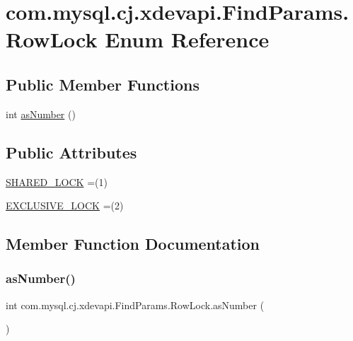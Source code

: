 \hypertarget{enumcom_1_1mysql_1_1cj_1_1xdevapi_1_1_find_params_1_1_row_lock}{}\section{com.\+mysql.\+cj.\+xdevapi.\+Find\+Params.\+Row\+Lock Enum Reference}
\label{enumcom_1_1mysql_1_1cj_1_1xdevapi_1_1_find_params_1_1_row_lock}
\subsection*{Public Member Functions}
\begin{DoxyCompactItemize}
\item 
int \mbox{\hyperlink{enumcom_1_1mysql_1_1cj_1_1xdevapi_1_1_find_params_1_1_row_lock_a57a87f452853827c81efc7860be4f7e6}{as\+Number}} ()
\end{DoxyCompactItemize}
\subsection*{Public Attributes}
\begin{DoxyCompactItemize}
\item 
\mbox{\hyperlink{enumcom_1_1mysql_1_1cj_1_1xdevapi_1_1_find_params_1_1_row_lock_a56bd068879b1d9dda39f4b1a082cb022}{S\+H\+A\+R\+E\+D\+\_\+\+L\+O\+CK}} =(1)
\item 
\mbox{\hyperlink{enumcom_1_1mysql_1_1cj_1_1xdevapi_1_1_find_params_1_1_row_lock_acef98c8e1183e4ff2af9bff73f5d400c}{E\+X\+C\+L\+U\+S\+I\+V\+E\+\_\+\+L\+O\+CK}} =(2)
\end{DoxyCompactItemize}


\subsection{Member Function Documentation}
\mbox{\label{enumcom_1_1mysql_1_1cj_1_1xdevapi_1_1_find_params_1_1_row_lock_a57a87f452853827c81efc7860be4f7e6}} 
\subsubsection{\texorpdfstring{as\+Number()}{asNumber()}}
{\footnotesize\ttfamily int com.\+mysql.\+cj.\+xdevapi.\+Find\+Params.\+Row\+Lock.\+as\+Number (\begin{DoxyParamCaption}{ }\end{DoxyParamCaption})}



